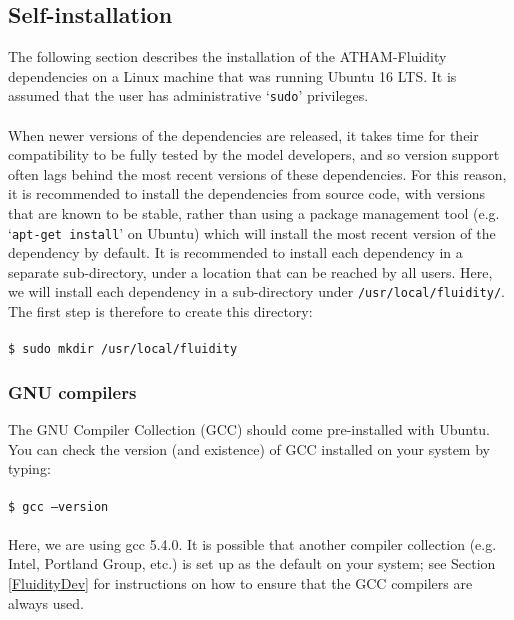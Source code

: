 \documentclass[10pt,a4paper]{article}
\newcommand\tab[1][0.5cm]{\hspace*{#1}}
\begin{document}
\subsection{Self-installation} \label{Self}
The following section describes the installation of the ATHAM-Fluidity dependencies on a Linux machine that was running Ubuntu 16 LTS. It is assumed that the user has administrative `\texttt{sudo}' privileges.\\\\
When newer versions of the dependencies are released, it takes time for their compatibility to be fully tested by the model developers, and so version support often lags behind the most recent versions of these dependencies. For this reason, it is recommended to install the dependencies from source code, with versions that are known to be stable, rather than using a package management tool (e.g. `\texttt{apt-get install}' on Ubuntu) which will install the most recent version of the dependency by default. It is recommended to install each dependency in a separate sub-directory, under a location that can be reached by all users. Here, we will install each dependency in a sub-directory under \texttt{/usr/local/fluidity/}. The first step is therefore to create this directory:\\\\
\tab \texttt{\$ sudo mkdir /usr/local/fluidity}

\subsubsection{GNU compilers}
The GNU Compiler Collection (GCC) should come pre-installed with Ubuntu. You can check the version (and existence) of GCC installed on your system by typing:\\\\
\tab \texttt{\$ gcc --version}\\\\
Here, we are using gcc 5.4.0. It is possible that another compiler collection (e.g. Intel, Portland Group, etc.) is set up as the default on your system; see Section \ref{FluidityDev} for instructions on how to ensure that the GCC compilers are always used.
\end{document}
